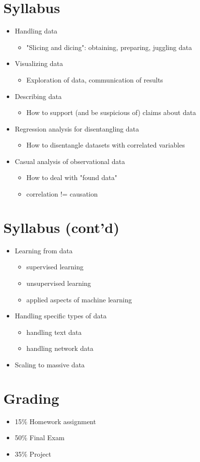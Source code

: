 \documentclass[11pt]{article}
\begin{document}
\section*{Syllabus}
\begin{itemize}
	\item Handling data
	\begin{itemize}
		\item "Slicing and dicing": obtaining, preparing, juggling data
	\end{itemize}	
	\item Visualizing data
	\begin{itemize}
		\item Exploration of data, communication of results
	\end{itemize}
	\item Describing data
	\begin{itemize}
		\item How to support (and be suspicious of) claims about data
	\end{itemize}
        \item Regression analysis for disentangling data
	\begin{itemize}
		\item How to disentangle datasets with correlated variables
	\end{itemize}
	\item Casual analysis of observational data
	\begin{itemize}
		\item How to deal with "found data"
		\item correlation != causation
	\end{itemize}
\end{itemize}

\section*{Syllabus (cont'd)}
\begin{itemize}
	\item Learning from data
	\begin{itemize}
		\item supervised learning
		\item unsupervised learning
		\item applied aspects of machine learning
	\end{itemize}
	\item Handling specific types of data
	\begin{itemize}
		\item handling text data
		\item handling network data
	\end{itemize}
	\item Scaling to massive data
\end{itemize}

\section*{Grading}

\begin{itemize}
	\item 15\% Homework assignment
	\item 50\% Final Exam
	\item 35\% Project 
\end{itemize}
\end{document}
